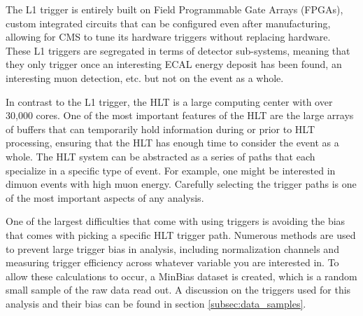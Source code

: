 The L1 trigger is entirely built on Field Programmable Gate Arrays (FPGAs), custom integrated circuits that can be configured even after manufacturing, allowing for CMS to tune its hardware triggers without replacing hardware. These L1 triggers are segregated in terms of detector sub-systems, meaning that they only trigger once an interesting ECAL energy deposit has been found, an interesting muon detection, etc. but not on the event as a whole. 

In contrast to the L1 trigger, the HLT is a large computing center with over 30,000 cores. One of the most important features of the HLT are the large arrays of buffers that can temporarily hold information during or prior to HLT processing, ensuring that the HLT has enough time to consider the event as a whole. The HLT system can be abstracted as a series of paths that each specialize in a specific type of event. For example, one might be interested in dimuon events with high muon energy. Carefully selecting the trigger paths is one of the most important aspects of any analysis. 

One of the largest difficulties that come with using triggers is avoiding the bias that comes with picking a specific HLT trigger path. Numerous methods are used to prevent large trigger bias in analysis, including normalization channels and measuring trigger efficiency across whatever variable you are interested in. To allow these calculations to occur, a MinBias dataset is created, which is a random small sample of the raw data read out. A discussion on the triggers used for this analysis and their bias can be found in section \ref{subsec:data_samples}.






